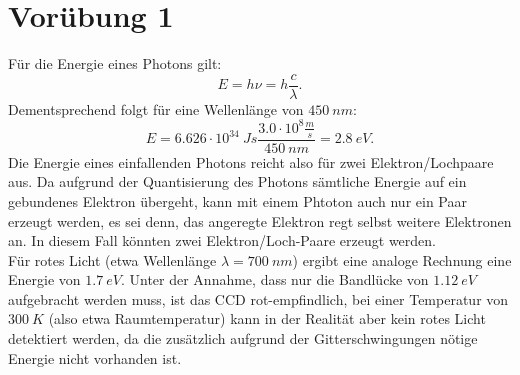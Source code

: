\documentclass[titlepage]{scrartcl}
\begin{document}
\section{Vorübung 1}
Für die Energie eines Photons gilt: 
\begin{equation}
E = h \nu = h \frac{c}{\lambda}. 
\end{equation}
Dementsprechend folgt für eine Wellenlänge von $450\ nm$: 
\begin{equation}
E = 6.626 \cdot 10^{34}\ Js \frac{3.0 \cdot 10^8 \frac{m}{s}}{450\ nm} = 2.8\ eV. 
\end{equation}
Die Energie eines einfallenden Photons reicht also für zwei Elektron/Lochpaare aus. 	Da aufgrund der Quantisierung des Photons sämtliche Energie auf ein gebundenes Elektron übergeht, kann mit einem Phtoton auch nur ein Paar erzeugt werden, es sei denn, das angeregte Elektron regt selbst weitere Elektronen an. In diesem Fall könnten zwei Elektron/Loch-Paare erzeugt werden.  \\
Für rotes Licht (etwa Wellenlänge $\lambda = 700\ nm $) ergibt eine analoge Rechnung eine Energie von $1.7\ eV $. Unter der Annahme, dass nur die Bandlücke von $1.12\ eV $ aufgebracht werden muss, ist das CCD rot-empfindlich, bei einer Temperatur von $ 300\ K $ (also etwa Raumtemperatur) kann in der Realität aber kein rotes Licht detektiert werden, da die zusätzlich aufgrund der Gitterschwingungen nötige Energie nicht vorhanden ist. 
\end{document}
